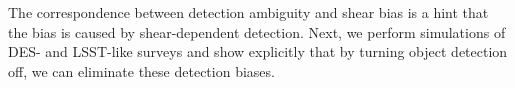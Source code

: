 \documentclass[fleqn,useAMS,usenatbib]{mnras}
\begin{document}
The correspondence between detection ambiguity and shear bias is a hint that
the bias is caused by shear-dependent detection. Next, we perform simulations
of DES- and LSST-like surveys and show explicitly that by turning object
detection off, we can eliminate these detection biases.

%
%
%
%
\end{document}
